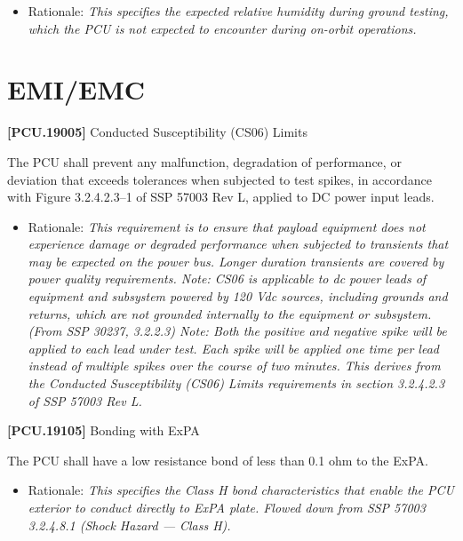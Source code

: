 \documentclass[12pt,oneside,oldfontcommands]{memoir}
\begin{document}
\begin{itemize}
\item{} Rationale: \emph{This specifies the expected relative humidity during ground testing, which the PCU is not expected to encounter during on-orbit operations.}

\end{itemize}

\section{EMI\slash EMC}
\label{emiemc}

\textbf{[PCU.19005]} Conducted Susceptibility (CS06) Limits

The \gls{PCU} shall prevent any malfunction, degradation of performance, or deviation that exceeds tolerances when subjected to test spikes, in accordance with Figure 3.2.4.2.3--1 of SSP 57003 Rev L, applied to DC power input leads.

\begin{itemize}
\item{} Rationale: \emph{This requirement is to ensure that payload equipment does not experience damage or degraded performance when subjected to transients that may be expected on the power bus. Longer duration transients are covered by power quality requirements. Note: CS06 is applicable to dc power leads of equipment and subsystem powered by 120 Vdc sources, including grounds and returns, which are not grounded internally to the equipment or subsystem. (From SSP 30237, 3.2.2.3) Note: Both the positive and negative spike will be applied to each lead under test. Each spike will be applied one time per lead instead of multiple spikes over the course of two minutes. This derives from the Conducted Susceptibility (CS06) Limits requirements in section 3.2.4.2.3 of SSP 57003 Rev L.}

\end{itemize}

\textbf{[PCU.19105]} Bonding with \gls{ExPA}

The \gls{PCU} shall have a low resistance bond of less than 0.1 ohm to the \gls{ExPA}.

\begin{itemize}
\item{} Rationale: \emph{This specifies the Class H bond characteristics that enable the PCU exterior to conduct directly to ExPA plate. Flowed down from SSP 57003 3.2.4.8.1 (Shock Hazard --- Class H).}

\end{itemize}
\end{document}
